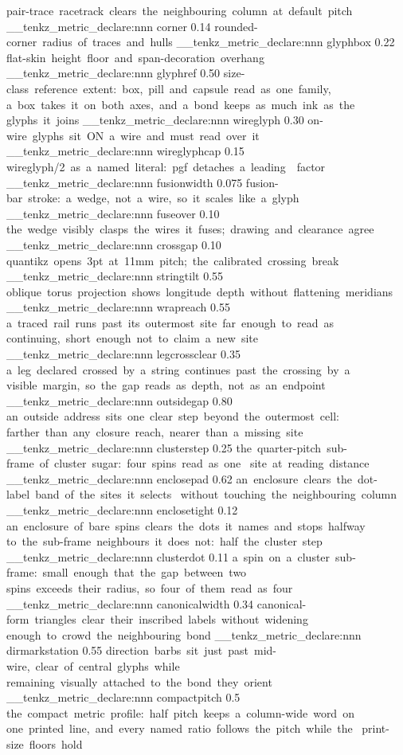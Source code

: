   { pair-trace~racetrack~clears~the~neighbouring~column~at~default~pitch }
\__tenkz_metric_declare:nnn {corner} {0.14}
  { rounded-corner~radius~of~traces~and~hulls }
\__tenkz_metric_declare:nnn {glyphbox} {0.22}
  { flat-skin~height~floor~and~span-decoration~overhang }
\__tenkz_metric_declare:nnn {glyphref} {0.50}
  { size-class~reference~extent:~box,~pill~and~capsule~read~as~one~family,~
    a~box~takes~it~on~both~axes,~and~a~bond~keeps~as~much~ink~as~the~
    glyphs~it~joins }
\__tenkz_metric_declare:nnn {wireglyph} {0.30}
  { on-wire~glyphs~sit~ON~a~wire~and~must~read~over~it }
\__tenkz_metric_declare:nnn {wireglyphcap} {0.15}
  { wireglyph/2~as~a~named~literal:~pgf~detaches~a~leading~\dimexpr~factor }
\__tenkz_metric_declare:nnn {fusionwidth} {0.075}
  { fusion-bar~stroke:~a~wedge,~not~a~wire,~so~it~scales~like~a~glyph }
\__tenkz_metric_declare:nnn {fuseover} {0.10}
  { the~wedge~visibly~clasps~the~wires~it~fuses;~drawing~and~clearance~agree }
\__tenkz_metric_declare:nnn {crossgap} {0.10}
  { quantikz~opens~3pt~at~11mm~pitch;~the~calibrated~crossing~break }
\__tenkz_metric_declare:nnn {stringtilt} {0.55}
  { oblique~torus~projection~shows~longitude~depth~without~flattening~meridians }
\__tenkz_metric_declare:nnn {wrapreach} {0.55}
  { a~traced~rail~runs~past~its~outermost~site~far~enough~to~read~as~
    continuing,~short~enough~not~to~claim~a~new~site }
\__tenkz_metric_declare:nnn {legcrossclear} {0.35}
  { a~leg~declared~crossed~by~a~string~continues~past~the~crossing~by~a~
    visible~margin,~so~the~gap~reads~as~depth,~not~as~an~endpoint }
\__tenkz_metric_declare:nnn {outsidegap} {0.80}
  { an~outside~address~sits~one~clear~step~beyond~the~outermost~cell:~
    farther~than~any~closure~reach,~nearer~than~a~missing~site }
\__tenkz_metric_declare:nnn {clusterstep} {0.25}
  { the~quarter-pitch~sub-frame~of~cluster~sugar:~four~spins~read~as~one~
    site~at~reading~distance }
\__tenkz_metric_declare:nnn {enclosepad} {0.62}
  { an~enclosure~clears~the~dot-label~band~of~the~sites~it~selects~
    without~touching~the~neighbouring~column }
\__tenkz_metric_declare:nnn {enclosetight} {0.12}
  { an~enclosure~of~bare~spins~clears~the~dots~it~names~and~stops~halfway~
    to~the~sub-frame~neighbours~it~does~not:~half~the~cluster~step }
\__tenkz_metric_declare:nnn {clusterdot} {0.11}
  { a~spin~on~a~cluster~sub-frame:~small~enough~that~the~gap~between~two~
    spins~exceeds~their~radius,~so~four~of~them~read~as~four }
\__tenkz_metric_declare:nnn {canonicalwidth} {0.34}
  { canonical-form~triangles~clear~their~inscribed~labels~without~widening~
    enough~to~crowd~the~neighbouring~bond }
\__tenkz_metric_declare:nnn {dirmarkstation} {0.55}
  { direction~barbs~sit~just~past~mid-wire,~clear~of~central~glyphs~while~
    remaining~visually~attached~to~the~bond~they~orient }
\__tenkz_metric_declare:nnn {compactpitch} {0.5}
  { the~compact~metric~profile:~half~pitch~keeps~a~column-wide~word~on~
    one~printed~line,~and~every~named~ratio~follows~the~pitch~while~the~
    print-size~floors~hold }

